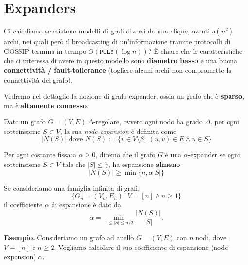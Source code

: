 \section{Expanders}

Ci chiediamo se esistono modelli di grafi diversi da una clique, aventi $o(n^2)$ archi, nei quali però il broadcasting di un'informazione tramite protocolli di GOSSIP termina in termpo $O(\texttt{POLY}(\log n))$? È chiaro che le caratteristiche che ci interessa di avere in questo modello sono \textbf{diametro basso} e una buona \textbf{connettività / fault-tollerance} (togliere alcuni archi non compromette la connettività del grafo).

Vedremo nel dettaglio la nozione di grafo expander, ossia un grafo che è \textbf{sparso}, ma è \textbf{altamente connesso}.

\begin{definizione}
    Dato un grafo $G = (V, E)\ \Delta$-regolare, ovvero ogni nodo ha grado $\Delta$, per ogni sottoinsieme $S \subset V$, la sua \textit{node-expansion} è definita come
    \[
        |N(S)| \text{ dove } N(S) := \{ v \in V \setminus S:\ (u, v) \in E \land u \in S \}
    \] 
\end{definizione}

\begin{definizione}
    Per ogni costante fissata $\alpha \geq 0$, diremo che il grafo $G$ è una $\alpha$-expander se ogni sottoinsieme $S \subset V$ tale che $|S| \leq \frac{n}{2}$, ha espansione \textbf{almeno} 
    \[
        |N(S)| \geq \min \{ n, \alpha|S| \}
    \]
\end{definizione}

Se consideriamo una famiglia infinita di grafi, 
\[
    \{ G_n=(V_n, E_n):\ V=[n] \land n \geq 1 \}
\]
il coefficiente $\alpha$ di espansione è dato da 
\[
    \alpha = \min_{1 \leq |S| \leq n/2} \frac{|N(S)|}{|S|}.
\]

\textbf{Esempio.} Consideriamo un grafo ad anello $G = (V, E)$ con $n$ nodi, dove $V = [n]$ e $n \geq 2$. Vogliamo calcolare il suo coefficiente di espansione (node-expansion) $\alpha$. 

